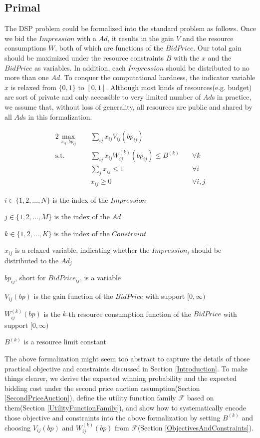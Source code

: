 \documentclass{article}
\newcommand{\sumj}{\sum\limits_j}
\newcommand{\sumij}{\sum\limits_{ij}}
\newcommand{\sx}{x_{ij}}
\newcommand{\sbp}{bp_{ij}}
\newcommand{\sV}{V_{ij}}
\newcommand{\sW}{W_{ij}^{(k)}}
\newcommand{\sB}{B^{(k)}}
\newcommand{\inRange}[1]{\in\{1,2,...,#1\}}
\newcommand{\uff}{\mathscr{F}}
\newcommand{\dspresourceconstraint}{\sumij \sx \sW(\sbp) \le \sB}
\newcommand{\assignmentconstraint}{\sumj \sx \le 1}
\begin{document}
\subsection{Primal} \label{Primal}

The DSP problem could be formalized into the standard problem as follows.
Once we bid the $Impression$ with a $Ad$, it results in the gain $V$ and the resource consumptions $W$, both of which are functions of the $BidPrice$.
Our total gain should be maximized under the resource constraints $B$ with the $x$ and the $BidPrice$ as variables.
In addition, each $Impression$ should be distributed to no more than one $Ad$.
To conquer the computational hardness, the indicator variable $x$ is relaxed from $\{0, 1\}$ to $[0, 1]$.
Although most kinds of resources(e.g. budget) are sort of private and only accessible to very limited number of $Ad$s in practice,
    we assume that, without loss of generality, all resources are public and shared by all $Ad$s in this formalization.

\begin{alignat}{2}
    \max\limits_{\sx, \sbp} \quad & \sumij \sx \sV(\sbp) \quad    & {} \\
    \mbox{s.t.} \quad             & \dspresourceconstraint \quad  & \forall k \\
    \quad                         & \assignmentconstraint \quad   & \forall i \\
    \quad                         & \sx \ge 0 \quad               & \forall i,j
\end{alignat}

$i \inRange{N}$ is the index of the $Impression$

$j \inRange{M}$ is the index of the $Ad$

$k \inRange{K}$ is the index of the $Constraint$

$\sx$ is a relaxed variable, indicating whether the $Impression_i$ should be distributed to the $Ad_j$

$\sbp$, short for $BidPrice_{ij}$, is a variable

$\sV(bp)$ is the gain function of the $BidPrice$ with support $[0, \infty)$

$\sW(bp)$ is the $k$-th resource consumption function of the $BidPrice$ with support $[0, \infty)$

$\sB$ is a resource limit constant

The above formalization might seem too abstract to capture the details of
    those practical objective and constraints discussed in Section \ref{Introduction}.
To make things clearer, we
    derive the expected winning probability and the expected bidding cost
        under the second price auction assumption(Section \ref{SecondPriceAuction}),
    define the utility function family $\uff$ based on them(Section \ref{UtilityFunctionFamily}),
    and show how to systematically encode those objective and constraints into the above formalization
        by setting $\sB$ and choosing $\sV(bp)$ and $\sW(bp)$ from $\uff$(Section \ref{ObjectivesAndConstraints}).
\end{document}
